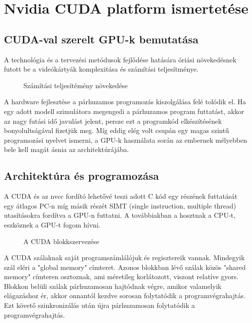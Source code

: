 \chapter{Nvidia CUDA platform ismertetése}

\section{CUDA-val szerelt GPU-k bemutatása}
A technológia és a tervezési metódusok fejlődése hatására óriási növekedésnek
futott be a videókártyák komplexitása és számítási teljesítménye.
\begin{figure}[H]
\centering
\caption{Számítási teljesítémény növekedése} 
\end{figure}
A hardware fejlesztése a párhuzamos programozás kiszolgálása felé tolódik el.
Ha egy adott modell szimulátora megengedi a párhuzamos program futtatást, akkor az nagy
futási idő javulást jelent,
persze ezt a programkód elkészítésének bonyolultságával fizetjük meg. 
Míg eddig elég volt csupán egy magas szintű programozási nyelvet ismerni,
a GPU-k használata során az embernek mélyebben bele kell magát ásnia az architektúrájába.



\section{Architektúra és programozása}

A CUDA és az nvcc fordító lehetővé teszi adott C kód
egy részének futtatását egy átlagos PC-n
míg másik részét SIMT (single instruction, multiple thread) utasításokra fordítva
a GPU-n futtatni.
A továbbiakban a hosztnak a CPU-t, eszköznek a GPU-t fogom hívni.

\begin{figure}[H]
\centering
\caption{A CUDA blokkszervezése} 
\end{figure}

\noindent A CUDA szálaknak saját programszámlálójuk és regisztereik vannak.
Mindegyik szál eléri a "global memory" címteret.
Azonos blokkban lévő szálak közös "shared memory" címteren osztoznak, ami méretileg korlátozott, viszont relatíve gyors.
Blokkon belüli szálak párhuzamosan hajtódnak végre, amikor valamelyik elágazáshoz ér,
akkor onnantól kezdve sorosan folytatódik a programvégrahajtás.
Ezt követő szinkronizálás után újra párhuzamosan folytatódik a programvégrahajtás.\\


